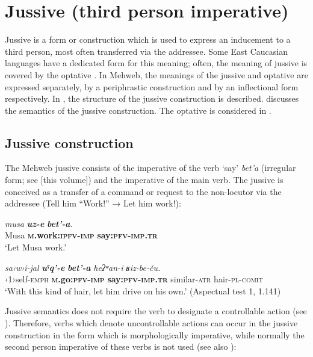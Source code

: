 ﻿\documentclass[output=paper]{langsci/langscibook}
\begin{document}
\removelastskip
{}

\section{Jussive (third person imperative)}\label{jussive}


Jussive is a form or construction which is used to express an inducement
to a third person, most often transferred via the addressee. Some East
Caucasian languages have a dedicated form for this meaning; often, the
meaning of jussive is covered by the optative \citep{dobrushina2012}. In Mehweb,
the meanings of the jussive and optative are expressed separately, by a
periphrastic construction and by an inflectional form respectively. In
, the structure of the jussive construction is described.
 discusses the semantics of the jussive construction.
The optative is considered in .

\subsection{Jussive construction}\label{jussive-construction}

The Mehweb jussive consists of the imperative of the verb `say'
\emph{bet'a} (irregular form; see \citealt{daniel2019} [this volume]) and the
imperative of the main verb. The jussive is conceived as a transfer of a
command or request to the non-locutor via the addressee (Tell him
``Work!'' → Let him work!):

\ea %
\gll \emph{musa} \emph{\textbf{uz-e}} \emph{\textbf{bet'-a}.}\\
 Musa \textbf{\textsc{m}.work:\textsc{ipfv}-\textsc{imp}} \textbf{say:\textsc{pfv}-\textsc{imp}.\textsc{tr}}\\
\glt `Let Musa work.'

\ex \label{ex:5:82} %
\gll \emph{sa‹w›i-jal} \emph{\textbf{uˤq'-e}} \emph{\textbf{bet'-a}} \emph{heʔʷan-i} \emph{ʁiz-be-ču.}\\
 ‹1›self-\textsc{emph} \textbf{\textsc{m}.go:\textsc{pfv}-\textsc{imp}} \textbf{say:\textsc{pfv}-\textsc{imp}.\textsc{tr}} similar-\textsc{atr} hair-\textsc{pl}-\textsc{comit}\\
\glt `With this kind of hair, let him drive on his own.' (Aspectual test 1,
1.141)
\z

Jussive semantics does not require the verb to designate a controllable
action (see ). Therefore, verbs which denote
uncontrollable actions can occur in the jussive construction in the form
which is morphologically imperative, while normally the second person
imperative of these verbs is not used (see also ):
\end{document}
